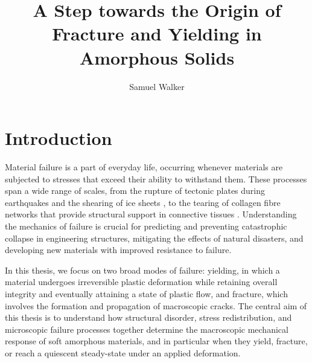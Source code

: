 \documentclass[asymmetricmargins]{library/duthesis}%
\title{A Step towards the Origin of Fracture and Yielding in Amorphous Solids}       %
\author{Samuel Walker}                              %
\begin{document}
\frontmatter                                        %
\titlepage                                          %
\declaration                                        %
\tableofcontents                                    %
\listoffigures                                      %
\mainmatter                                         %
 \newpage %

\setcounter{equation}{0}
\chapter{Introduction}

Material failure is a part of everyday life, occurring whenever materials are subjected to stresses that exceed their ability to withstand them. These processes span a wide range of scales, from the rupture of tectonic plates during earthquakes \cite{Cocco2023} and the shearing of ice sheets \cite{Jennings2021}, to the tearing of collagen fibre networks that provide structural support in connective tissues \cite{Burla2020}. Understanding the mechanics of failure is crucial for predicting and preventing catastrophic collapse in engineering structures, mitigating the effects of natural disasters, and developing new materials with improved resistance to failure.

In this thesis, we focus on two broad modes of failure: yielding, in which a material undergoes irreversible plastic deformation while retaining overall integrity and eventually attaining a state of plastic flow, and fracture, which involves the formation and propagation of macroscopic cracks. The central aim of this thesis is to understand how structural disorder, stress redistribution, and microscopic failure processes together determine the macroscopic mechanical response of soft amorphous materials, and in particular when they yield, fracture, or reach a quiescent steady-state under an applied deformation.
\end{document}
